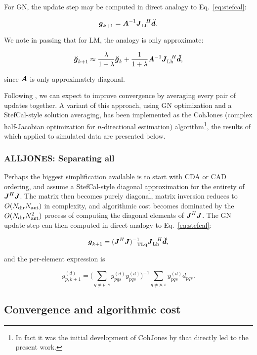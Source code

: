 \documentclass[useAMS,usenatbib]{mn2e}
\newcommand{\mat}[1]{{\bmath{#1}}}
\newcommand{\JJ}{\mat{J}} %
\newcommand{\JHJ}{\JJ^H\JJ} %
\newcommand{\StefCal}{{\sc StefCal}}
\begin{document}
For GN, the update step may be computed in direct analogy to Eq.~\ref{eq:stefcal}:

\[
\bmath{g}_{k+1} = \bmath{A}^{-1} \JJ_\LEFT^{~~H} \Dd.
\]

We note in passing that for LM, the analogy is only approximate:

\[
\Gg_{k+1} \approx \frac{\lambda}{1+\lambda}\Gg_k + \frac{1}{1+\lambda} \bmath{A}^{-1} \JJ_\LEFT^{~~H} \Dd,
\]

since $\bmath{A}$ is only approximately diagonal.

Following \citet{Stefcal}, we can expect to improve convergence by averaging every pair of updates together. 
A variant of this approach, using GN optimization and a \StefCal-style solution averaging, has been 
implemented as the {\sc CohJones} (complex half-Jacobian optimization for $n$-directional estimation) 
algorithm\footnote{In fact it was the initial development of {\sc CohJones} by \citet{tasse-cohjones} that directly led to the
present work.}, the results of which applied to simulated data are presented below.

\subsubsection{ALLJONES: Separating all}

Perhaps the biggest simplification available is to start with CDA or CAD ordering, and assume a \StefCal-style diagonal 
approximation for the entirety of $\JHJ$. The matrix then becomes purely diagonal, matrix inversion reduces to $O(N_\mathrm{dir}N_\mathrm{ant})$ in 
complexity, and algorithmic cost becomes dominated by the $O(N_\mathrm{dir}N_\mathrm{ant}^2)$ process of computing the diagonal elements of 
$\JHJ$. The GN update step can then computed in direct analogy to Eq.~\ref{eq:stefcal}:

\[
\bmath{g}_{k+1} = (\JHJ)^{-1}_{~~\UL} \JJ^{~~H}_\LEFT \Dd,
\]

and the per-element expression is 

\begin{equation}
\label{eq:stefcal:dd:unpol}
g_{p,k+1}^{(d)} = 
\big( \sum\limits_{q\ne p,s} \bar{y}^{(d)}_{pqs} y^{(d)}_{pqs} \big)^{-1}
\sum\limits_{q\ne p,s} \bar{y}^{(d)}_{pqs} d_{pqs}.
\end{equation}

\subsection{Convergence and algorithmic cost}
\end{document}
